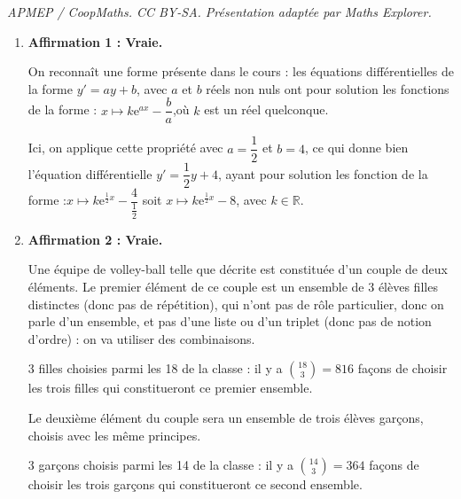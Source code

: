 \documentclass[10pt]{article}
\providecommand{\R}{\mathbb{R}}
\providecommand{\e}{{\mathrm{e}}}
\begin{document}
\noindent\textit{APMEP / CoopMaths. CC BY-SA. Présentation adaptée par Maths Explorer.}\par\medskip
\medskip

\begin{enumerate}
	\item \textbf{Affirmation 1 : Vraie.}

	
	
	

	On reconnaît une forme présente dans le cours : les équations différentielles de la forme $y' = ay + b$, avec $a$ et $b$ réels non nuls ont pour solution les fonctions de la forme : \quad $x \longmapsto k\e^{ax} - \dfrac{b}{a}$,\quad où $k$ est un réel quelconque.

	Ici, on applique cette propriété avec $a = \dfrac{1}{2}$ et $b = 4$, ce qui donne bien l'équation différentielle $y' = \dfrac{1}{2}y + 4$, ayant pour solution les fonction de la forme :\quad$x \longmapsto k\e^{\frac{1}{2}x} - \dfrac{4}{\frac{1}{2}}$ soit $x \longmapsto k\e^{\frac{1}{2}x} - 8$, avec $k\in \R$.

	
	
		
		
		
		
		
		
		
			
			
			
			
			
			
		
		
		
		

	\item \textbf{Affirmation 2 : Vraie.}

	Une équipe de volley-ball telle que décrite est constituée d'un couple de deux éléments. Le premier élément de ce couple est un ensemble de 3 élèves filles distinctes (donc pas de répétition), qui n'ont pas de rôle particulier, donc on parle d'un ensemble, et pas d'une liste ou d'un triplet (donc pas de notion d'ordre) : on va utiliser des combinaisons.

	3 filles choisies parmi les 18 de la classe : il y a $\displaystyle \binom{18}{3} = 816$ façons de choisir les trois filles qui constitueront ce premier ensemble.

	Le deuxième élément du couple sera un ensemble de trois élèves garçons, choisis avec les même principes.

	3 garçons choisis parmi les 14 de la classe : il y a $\displaystyle \binom{14}{3} = 364$ façons de choisir les trois garçons qui constitueront ce second ensemble.


\end{enumerate}
\end{document}
